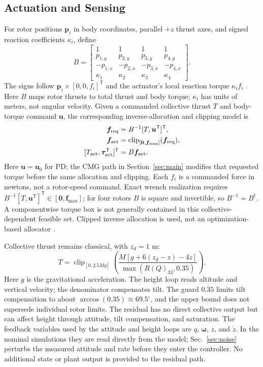 \documentclass[letterpaper, 10 pt, conference]{ieeeconf}
\newcommand{\T}{^{\mathsf T}}
\newcommand{\clip}{\operatorname{clip}}
\begin{document}
\subsection{Actuation and Sensing}
%
For rotor positions $\bm p_i$ in body coordinates, parallel $+z$ thrust
axes, and signed reaction coefficients $\kappa_i$, define
\begin{equation}
 B=\begin{bmatrix}
 1&1&1&1\\p_{1,y}&p_{2,y}&p_{3,y}&p_{4,y}\\
 -p_{1,x}&-p_{2,x}&-p_{3,x}&-p_{4,x}\\
 \kappa_1&\kappa_2&\kappa_3&\kappa_4
 \end{bmatrix}.
 \label{eq:allocationmatrix}
\end{equation}
The signs follow $\bm p_i\times[0,0,f_i]\T$ and the actuator's local reaction torque $\kappa_i f_i$ \cite{garciacarrillo2013quad}. Here $B$ maps rotor thrusts to total thrust and body torque; $\kappa_i$ has units of meters, not angular velocity. Given a commanded collective thrust $T$ and body-torque command $\bm u$, the corresponding inverse-allocation and clipping model is
\begin{equation}
 \begin{aligned}
 \bm f_{\rm req}&=B^{-1}[T,\bm u\T]\T,\\
 \bm f_{\rm act}&=\clip_{[\bm0,\bm f_{\max}]}(\bm f_{\rm req}),\\
 [T_{\rm act},\bm\tau_{\rm act}\T]\T&=B\bm f_{\rm act}.
 \end{aligned}
 \label{eq:mixer}
\end{equation}
Here $\bm u=\bm u_0$ for PD; the CMG path in Section~\ref{sec:main}
modifies that requested torque before the same allocation and clipping.
Each $f_i$ is a commanded force in newtons, not a rotor-speed command.
Exact wrench realization requires $B^{-1}[T,\bm u\T]\T\in[\bm0,\bm f_{\max}]$; for four
rotors $B$ is square and invertible, so $B^{-1}=B^{\dagger}$.
A componentwise torque box is not generally contained in this
collective-dependent feasible set. Clipped inverse allocation is used,
not an optimization-based allocator \cite{monteiro2016allocation}.

Collective thrust remains classical, with $z_d=1$ m:
\begin{equation}
 T=\clip_{[0,2.5Mg]}
 \left(\frac{M[g+6(z_d-z)-4\dot z]}{\max(R(Q)_{33},0.35)}\right).
 \label{eq:collective}
\end{equation}
Here $g$ is the gravitational acceleration. The height loop reads altitude and vertical velocity; the denominator compensates tilt.
The guard $0.35$ limits tilt compensation to about $\arccos(0.35)\approx69.5^\circ$, and the upper bound does
not supersede individual rotor limits. The residual has no direct collective
output but can affect height through attitude, tilt compensation, and
saturation.
The feedback variables used by the attitude and height loops are $q$, $\bm\omega$, $z$, and $\dot z$. In the nominal simulations they are read directly from the model; Sec.~\ref{sec:noise} perturbs the measured attitude and rate before they enter the controller. No additional state or plant output is provided to the residual path.
\end{document}
